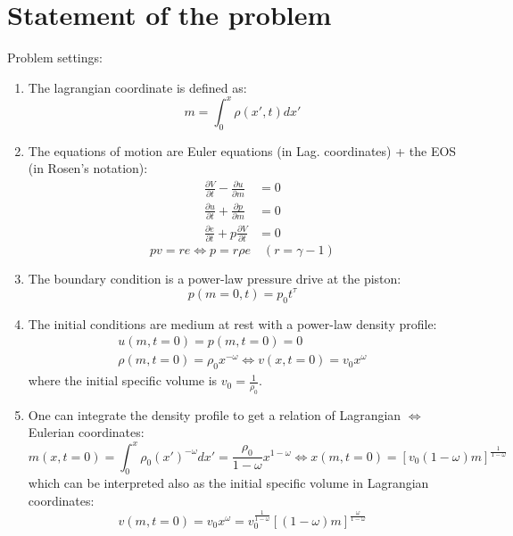 \documentclass[11pt]{article}
\begin{document}
\section{Statement of the problem}
Problem settings:
\begin{enumerate}
  \item The lagrangian coordinate is defined as:
  \begin{equation}
      m = \int_0^x \rho(x', t) dx'
  \end{equation}
  \item The equations of motion are Euler equations (in Lag. coordinates) + the EOS (in Rosen's notation):
  \begin{align}
      \frac{\partial V}{\partial t} - \frac{\partial u}{\partial m} &= 0 \\
      \frac{\partial u}{\partial t} + \frac{\partial p}{\partial m} &= 0 \\
      \frac{\partial e}{\partial t} + p \frac{\partial V}{\partial t} &= 0
  \end{align}
  \begin{equation}
      pv = re \Leftrightarrow p = r \rho e \quad (r = \gamma - 1)
  \end{equation}
  \item The boundary condition is a power-law pressure drive at the piston:
  \begin{equation}
    p(m=0, t) = p_0 t^\tau
  \end{equation}
  \item The initial conditions are medium at rest with a power-law density profile:
  \begin{align}
    u(m, t=0) = p(m, t=0) = 0 \\
    \rho(m, t=0) = \rho_0 x^{-\omega} \Leftrightarrow v(x,t=0) = v_0 x^\omega
  \end{align}
  where the initial specific volume is $v_0 = \frac{1}{\rho_0}$.
  \item One can integrate the density profile to get a relation of Lagrangian $\Leftrightarrow$ Eulerian coordinates:
  \begin{equation}
    m(x,t=0) = \int_0^x \rho_0 (x')^{-\omega} dx' = \frac{\rho_0}{1-\omega} x^{1-\omega} \Leftrightarrow \boxed{x(m, t=0) = \left[ v_0 (1-\omega)m \right]^{\frac{1}{1-\omega}}}
  \end{equation}
  which can be interpreted also as the initial specific volume in Lagrangian coordinates:
  \begin{equation}
    \boxed{v(m, t=0)} = v_0 x^\omega = \boxed{v_0 ^{\frac{1}{1-\omega}}\left[(1-\omega)m \right]^{\frac{\omega}{1-\omega}}}
  \end{equation}
\end{enumerate}
\end{document}
